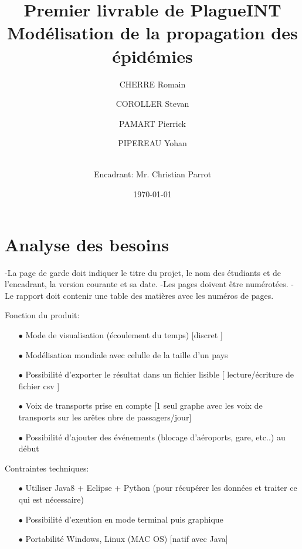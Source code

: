 \documentclass[12pt,a4paper]{report}
\title{Premier livrable de PlagueINT \\ \large Modélisation de la propagation des épidémies}
\date{\today}
\author{CHERRE Romain \and COROLLER Stevan \and  PAMART Pierrick \and PIPEREAU Yohan
\and \\
Encadrant: Mr. Christian Parrot
}
\begin{document}
\maketitle
\tableofcontents

\chapter*{Analyse des besoins}


\begin{flushleft}
 -La page de garde doit indiquer le titre du projet, le nom des étudiants et de l'encadrant, la version courante et sa date.
-Les pages doivent être numérotées.
-Le rapport doit contenir une table des matières avec les numéros de pages.
\end{flushleft}

\begin{flushleft}
Fonction du produit:
  \begin{itemize}
	\item[$\bullet$] Mode de visualisation (écoulement du temps) [discret ]
	\item[$\bullet$] Modélisation mondiale avec celulle de la taille d'un pays
	\item[$\bullet$] Possibilité d'exporter le résultat dans un fichier lisible [ lecture/écriture de fichier csv ]
	\item[$\bullet$] Voix de transports prise en compte [1 seul graphe avec les voix de transports sur les arêtes nbre de passagers/jour]
	\item[$\bullet$] Possibilité d'ajouter des événements (blocage d'aéroports, gare, etc..) au début
  \end{itemize}
\end{flushleft}

\begin{flushleft}
Contraintes techniques:
  \begin{itemize}
	\item[$\bullet$] Utiliser Java8 + Eclipse + Python (pour récupérer les données et traiter ce qui est nécessaire)
	\item[$\bullet$] Possibilité d'exeution en mode terminal puis graphique
	\item[$\bullet$] Portabilité Windows, Linux (MAC OS) [natif avec Java]
    \end{itemize}
\end{flushleft}
\end{document}

